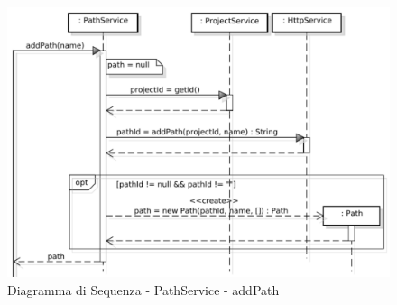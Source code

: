 \FloatBarrier
{}
\begin{center}
\begin{figure}[h]
\centering
\includegraphics[scale=0.33,keepaspectratio]{diagrammi/sequenza/FrontEnd/services/addPath.pdf}
\caption{Diagramma di Sequenza - PathService - addPath}
\end{figure}
\end{center}
\FloatBarrier
{}
